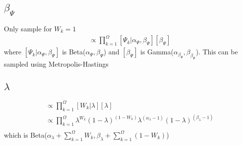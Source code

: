 \documentclass[fleqn]{article}
\begin{document}
\subsection{$\beta_\Psi$}
%
Only sample for $W_k = 1$
%
\begin{align*}
  [\beta_\Psi | \cdot] & \propto \prod_{k = 1}^\Omega [\Psi_k | \alpha_\Psi, \beta_\Psi] [\beta_\Psi]
\end{align*}
where $[\Psi_k | \alpha_\Psi, \beta_\Psi]$ is Beta($\alpha_\Psi, \beta_\Psi$) and $[\beta_\Psi]$ is Gamma($\alpha_{\beta_\Psi}, \beta_{\beta_\Psi}$). This can be sampled using Metropolis-Hastings
%
\subsection{$\lambda$}
%
\begin{align*}
  [\lambda | \cdot ] & \propto \prod_{k = 1}^\Omega [W_k | \lambda] [\lambda]\\
  & \propto  \prod_{k = 1}^\Omega \lambda^{W_k} (1 - \lambda)^{(1 - W_k)} \lambda^{(\alpha_\lambda - 1)} (1 - \lambda)^{(\beta_\lambda - 1)}\\
\end{align*}
%
which is Beta($\alpha_\lambda + \sum_{k = 1}^\Omega W_k, \beta_\lambda + \sum_{k = 1}^\Omega (1 - W_k)$)
\end{document}
